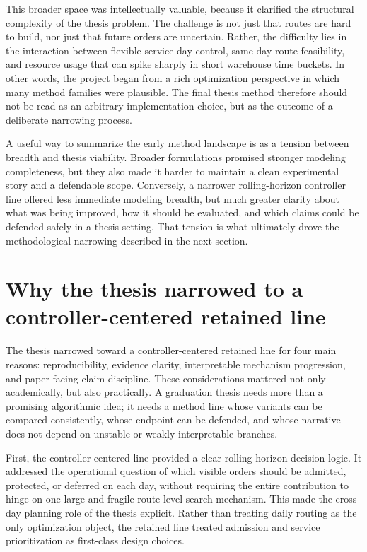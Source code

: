 This broader space was intellectually valuable, because it clarified the structural complexity of the thesis problem. The challenge is not just that routes are hard to build, nor just that future orders are uncertain. Rather, the difficulty lies in the interaction between flexible service-day control, same-day route feasibility, and resource usage that can spike sharply in short warehouse time buckets. In other words, the project began from a rich optimization perspective in which many method families were plausible. The final thesis method therefore should not be read as an arbitrary implementation choice, but as the outcome of a deliberate narrowing process.

A useful way to summarize the early method landscape is as a tension between breadth and thesis viability. Broader formulations promised stronger modeling completeness, but they also made it harder to maintain a clean experimental story and a defendable scope. Conversely, a narrower rolling-horizon controller line offered less immediate modeling breadth, but much greater clarity about what was being improved, how it should be evaluated, and which claims could be defended safely in a thesis setting. That tension is what ultimately drove the methodological narrowing described in the next section.

\section{Why the thesis narrowed to a controller-centered retained line}

The thesis narrowed toward a controller-centered retained line for four main reasons: reproducibility, evidence clarity, interpretable mechanism progression, and paper-facing claim discipline. These considerations mattered not only academically, but also practically. A graduation thesis needs more than a promising algorithmic idea; it needs a method line whose variants can be compared consistently, whose endpoint can be defended, and whose narrative does not depend on unstable or weakly interpretable branches.

First, the controller-centered line provided a clear rolling-horizon decision logic. It addressed the operational question of which visible orders should be admitted, protected, or deferred on each day, without requiring the entire contribution to hinge on one large and fragile route-level search mechanism. This made the cross-day planning role of the thesis explicit. Rather than treating daily routing as the only optimization object, the retained line treated admission and service prioritization as first-class design choices.

